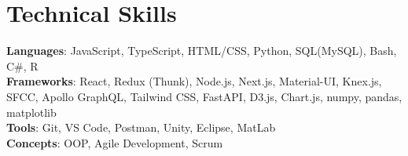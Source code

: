 \section{Technical Skills}
 \begin{itemize}[leftmargin=0.15in, label={}]
  \small{\item{
    \textbf{Languages}{: JavaScript, TypeScript, HTML/CSS, Python, SQL(MySQL), Bash, C\#, R} \\
    \textbf{Frameworks}{: React, Redux (Thunk), Node.js, Next.js, Material-UI, Knex.js, SFCC, Apollo GraphQL, Tailwind CSS, FastAPI, D3.js, Chart.js, numpy, pandas, matplotlib} \\
    \textbf{Tools}{: Git, VS Code, Postman, Unity, Eclipse, MatLab} \\
    \textbf{Concepts}{: OOP, Agile Development, Scrum} \\
  }}
 \end{itemize}

